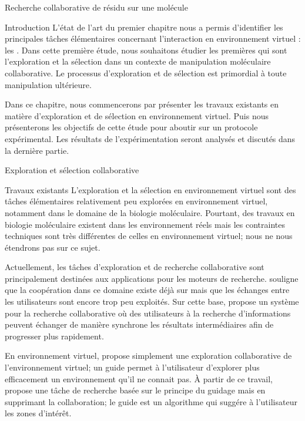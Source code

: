 \documentclass[myfrancais,ngerman,english,frenchb]{mythesis}
\begin{document}
	\begin{mychapter}{Recherche collaborative de résidu sur une molécule}
		\begin{mysection}{Introduction}
			L'état de l'art du premier chapitre nous a permis d'identifier les principales tâches élémentaires concernant l'interaction en environnement virtuel : les .
			Dans cette première étude, nous souhaitons étudier les premières  qui sont l'exploration et la sélection  dans un contexte de manipulation moléculaire collaborative.
			Le processus d'exploration et de sélection est primordial à toute manipulation ultérieure.

			Dans ce chapitre, nous commencerons par présenter les travaux existants en matière d'exploration et de sélection en environnement virtuel.
			Puis nous présenterons les objectifs de cette étude pour aboutir sur un protocole expérimental.
			Les résultats de l'expérimentation seront analysés et discutés dans la dernière partie.
		\end{mysection}
		\begin{mysection}{Exploration et sélection collaborative}
			\begin{mysubsection}{Travaux existants}
				L'exploration et la sélection en environnement virtuel sont des tâches élémentaires relativement peu explorées en environnement virtuel, notamment dans le domaine de la biologie moléculaire.
				Pourtant, des travaux en biologie moléculaire existent dans les environnement réels mais les contraintes techniques sont très différentes de celles en environnement virtuel; nous ne nous étendrons pas sur ce sujet.

				Actuellement, les tâches d'exploration et de recherche collaborative sont principalement destinées aux applications pour les moteurs de recherche.
				 souligne que la coopération dans ce domaine existe déjà sur \myInternet mais que les échanges entre les utilisateurs sont encore trop peu exploités.
				Sur cette base,  propose un système pour la recherche collaborative où des utilisateurs à la recherche d'informations peuvent échanger de manière synchrone les résultats intermédiaires afin de progresser plus rapidement.

				En environnement virtuel,  propose simplement une exploration collaborative de l'environnement virtuel; un guide permet à l'utilisateur d'explorer plus efficacement un environnement qu'il ne connait pas.
				À partir de ce travail,  propose une tâche de recherche basée sur le principe du guidage mais en supprimant la collaboration; le guide est un algorithme qui suggére à l'utilisateur les zones d'intérêt.


\end{mysubsection}
\end{mysection}
\end{mychapter}
\end{document}
